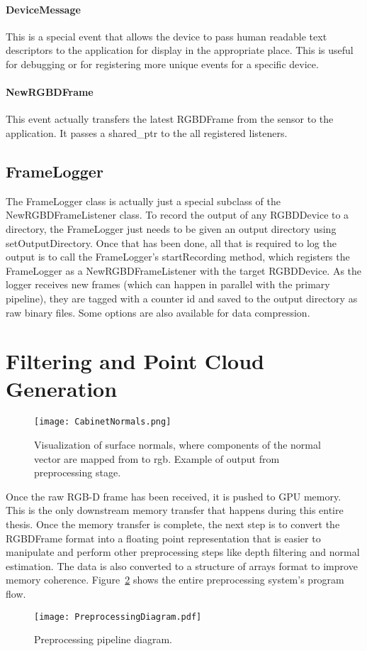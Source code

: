\paragraph{DeviceMessage}
This is a special event that allows the device to pass human readable text descriptors to the application for display in the appropriate place. This is useful for debugging or for registering more unique events for a specific device.
\paragraph{NewRGBDFrame}
This event actually transfers the latest RGBDFrame from the sensor to the application. It passes a shared\_ptr to the all registered listeners.
\subsection{FrameLogger}
The FrameLogger class is actually just a special subclass of the NewRGBDFrameListener class. To record the output of any RGBDDevice to a directory, the FrameLogger just needs to be given an output directory using setOutputDirectory. Once that has been done, all that is required to log the output is to call the FrameLogger's startRecording method, which registers the FrameLogger as a NewRGBDFrameListener with the target RGBDDevice. As the logger receives new frames (which can happen in parallel with the primary pipeline), they are tagged with a counter id and saved to the output directory as raw binary files. Some options are also available for data compression.


\section{Filtering and Point Cloud Generation}
\begin{figure}[!htbp]
    \centering
    \texttt{[image: CabinetNormals.png]}
    \caption{Visualization of surface normals, where components of the normal vector are mapped from to rgb. Example of output from preprocessing stage. }
    \label{fig:filteringoutput}
\end{figure}
Once the raw RGB-D frame has been received, it is pushed to GPU memory. This is the only downstream memory transfer that happens during this entire thesis. Once the memory transfer is complete, the next step is to convert the RGBDFrame format into a floating point representation that is easier to manipulate and perform other preprocessing steps like depth filtering and normal estimation. The data is also converted to a structure of arrays format to improve memory coherence. Figure~\ref{fig:preprocessingdiagram} shows the entire preprocessing system's program flow. 
\begin{figure}[!hp]
    \centering
    \texttt{[image: PreprocessingDiagram.pdf]}
    \caption{Preprocessing pipeline diagram.}
    \label{fig:preprocessingdiagram}
\end{figure}
